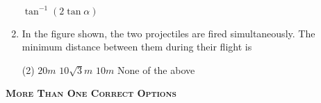 \documentclass{article}
\begin{document}
\begin{enumerate}
\begin{tasks}
        \task \( \tan^{-1}\left( 2 \tan \alpha \right) \)
    \end{tasks}
    \item In the figure shown, the two projectiles are fired simultaneously. The minimum distance between them during their flight is
    \begin{center}
    \end{center}
    \begin{tasks}(2)
        \task \(20 m\)
        \task \(10 \sqrt{3} m\)
        \task \(10 m\)
        \task None of the above
    \end{tasks}
\end{enumerate}

\begin{center}
    \textsc{\textbf{More Than One Correct Options}}
\end{center}
\end{document}
